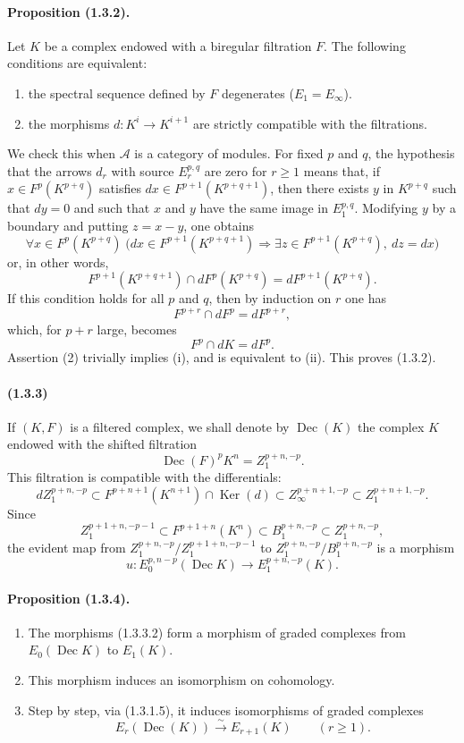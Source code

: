 \documentclass[10pt]{article}
\newcommand{\Ker}{\operatorname{Ker}}
\newcommand{\calA}{\mathcal A}
\newcommand{\iso}{\xrightarrow{\sim}}
\newcommand{\Dec}{\operatorname{Dec}}
\begin{document}
\paragraph{Proposition (1.3.2).} Let $K$ be a complex endowed with a biregular filtration $F$. The following conditions are equivalent:
\begin{enumerate}[label=(\roman*)]
\item the spectral sequence defined by $F$ degenerates ($E_1=E_\infty$).
\item the morphisms $d:K^i\to K^{i+1}$ are strictly compatible with the filtrations.
\end{enumerate}
We check this when $\calA$ is a category of modules. For fixed $p$ and $q$, the hypothesis that the arrows $d_r$ with source $E_r^{p,q}$ are zero for $r\geq1$ means that, if $x\in F^p(K^{p+q})$ satisfies $dx\in F^{p+1}(K^{p+q+1})$, then there exists $y$ in $K^{p+q}$ such that $dy=0$ and such that $x$ and $y$ have the same image in $E_1^{p,q}$. Modifying $y$ by a boundary and putting $z=x-y$, one obtains
\[
\forall x\in F^p(K^{p+q})\;\bigl(dx\in F^{p+1}(K^{p+q+1})\Rightarrow
\exists z\in F^{p+1}(K^{p+q}),\ dz=dx\bigr)
\]
or, in other words,
\[
\tag{1}
F^{p+1}(K^{p+q+1})\cap dF^p(K^{p+q})=dF^{p+1}(K^{p+q}).
\]
If this condition holds for all $p$ and $q$, then by induction on $r$ one has
\[
F^{p+r}\cap dF^p=dF^{p+r},
\]
which, for $p+r$ large, becomes
\[
\tag{2}
F^p\cap dK=dF^p.
\]
Assertion (2) trivially implies (i), and is equivalent to (ii). This proves (1.3.2).

\paragraph{(1.3.3)} If $(K,F)$ is a filtered complex, we shall denote by $\Dec(K)$ the complex $K$ endowed with the shifted filtration
\[
\Dec(F)^pK^n=Z_1^{p+n,-p}.
\]
This filtration is compatible with the differentials:
\[
dZ_1^{p+n,-p}\subset F^{p+n+1}(K^{n+1})\cap\Ker(d)
       \subset Z_\infty^{p+n+1,-p}\subset Z_1^{p+n+1,-p}.
\]
Since
\[
\tag{1.3.3.1}
Z_1^{p+1+n,-p-1}\subset F^{p+1+n}(K^n)\subset B_1^{p+n,-p}\subset Z_1^{p+n,-p},
\]
the evident map from $Z_1^{p+n,-p}/Z_1^{p+1+n,-p-1}$ to $Z_1^{p+n,-p}/B_1^{p+n,-p}$ is a morphism
\[
\tag{1.3.3.2}
u:E_0^{p,n-p}(\Dec K)\longrightarrow E_1^{p+n,-p}(K).
\]

\paragraph{Proposition (1.3.4).}
\begin{enumerate}[label=(\roman*)]
\item The morphisms (1.3.3.2) form a morphism of graded complexes from $E_0(\Dec K)$ to $E_1(K)$.
\item This morphism induces an isomorphism on cohomology.
\item Step by step, via (1.3.1.5), it induces isomorphisms of graded complexes
\[
E_r(\Dec(K))\iso E_{r+1}(K)\qquad(r\ge1).
\]
\end{enumerate}
\end{document}
